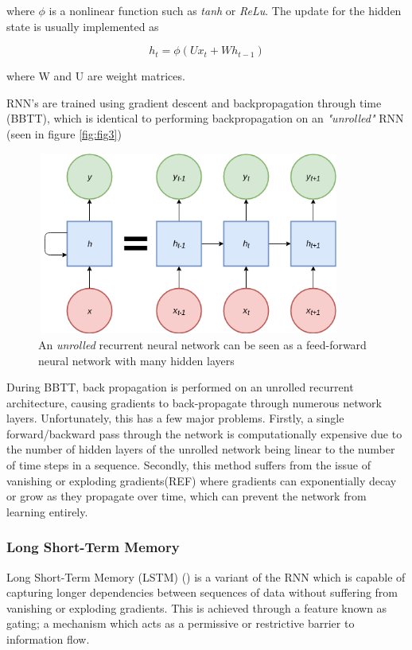 \noindent
where $\phi$ is a nonlinear function such as \textit{tanh} or \textit{ReLu}. The update for the hidden state is usually implemented as 

\begin{equation}
h_{t} = \phi{(Ux_{t} + Wh_{t-1})}
\end{equation}

\noindent
where W and U are weight matrices.

\par
\noindent
\newline
RNN's are trained using gradient descent and backpropagation through time (BBTT), which is identical to performing backpropagation on an \textit{"unrolled"} RNN (seen in figure \autoref{fig:fig3})

\begin{figure}[h]
	\includegraphics[width=10cm, height=6cm]{./figures/fig3}
	\centering
	\caption{An \textit{unrolled} recurrent neural network can be seen as a feed-forward neural network with many hidden layers}
	\label{fig:fig3}
\end{figure}

\par
\noindent
During BBTT, back propagation is performed on an unrolled recurrent architecture, causing gradients to back-propagate through numerous network layers. Unfortunately, this has a few major problems. Firstly, a single forward/backward pass through the network is computationally expensive due to the number of hidden layers of the unrolled network being linear to the number of time steps in a sequence. Secondly, this method suffers from the issue of vanishing or exploding gradients(REF) where gradients can exponentially decay or grow as they propagate over time, which can prevent the network from learning entirely.
\subsubsection{Long Short-Term Memory}
Long Short-Term Memory (LSTM) (\cite{Hochreiter1997}) is a variant of the RNN which is capable of capturing longer dependencies between sequences of data without suffering from vanishing or exploding gradients. This is achieved through a feature known as gating; a mechanism which acts as a permissive or restrictive barrier to information flow. 


